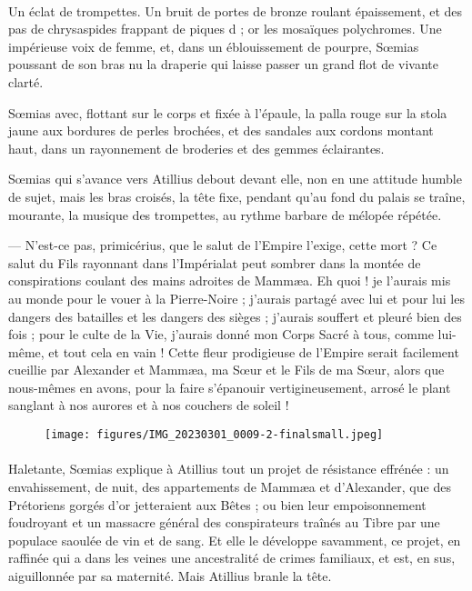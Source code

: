 \documentclass[a4paper, 11pt, oneside, polutonikogreek, french]{article}
\begin{document}
\paragraph{}
Un éclat de trompettes. Un bruit de portes de bronze roulant épaissement, et des pas de chrysaspides frappant de piques d ; or les mosaïques polychromes. Une impérieuse voix de femme, et, dans un éblouissement de pourpre, Sœmias poussant de son bras nu la draperie qui laisse passer un grand flot de vivante clarté.

Sœmias avec, flottant sur le corps et fixée à l'épaule, la palla rouge sur la stola jaune aux bordures de perles brochées, et des sandales aux cordons montant haut, dans un rayonnement de broderies et des gemmes éclairantes.

Sœmias qui s'avance vers Atillius debout devant elle, non en une attitude humble de sujet, mais les bras croisés, la tête fixe, pendant qu'au fond du palais se traîne, mourante, la musique des trompettes, au rythme barbare de mélopée répétée.

--- N'est-ce pas, primicérius, que le salut de l'Empire l'exige, cette mort ? Ce salut du Fils rayonnant dans l'Impérialat peut sombrer dans la montée de conspirations coulant des mains adroites de Mammæa. Eh quoi ! je l'aurais mis au monde pour le vouer à la Pierre-Noire ; j'aurais partagé avec lui et pour lui les dangers des batailles et les dangers des sièges ; j'aurais souffert et pleuré bien des fois ; pour le culte de la Vie, j'aurais donné mon Corps Sacré à tous, comme lui-même, et tout cela en vain ! Cette fleur prodigieuse de l'Empire serait facilement cueillie par Alexander et Mammæa, ma Sœur et le Fils de ma Sœur, alors que nous-mêmes en avons, pour la faire s'épanouir vertigineusement, arrosé le plant sanglant à nos aurores et à nos couchers de soleil !
\clearpage
\begin{landscape}
\pagestyle{fancy}
\fancyhf{}
\cfoot{\thepage}
\begin{figure}[H]
\centering
\texttt{[image: figures/IMG\_20230301\_0009-2-finalsmall.jpeg]}
\end{figure}
\end{landscape}
\clearpage
\paragraph{}
Haletante, Sœmias explique à Atillius tout un projet de résistance effrénée : un envahissement, de nuit, des appartements de Mammæa et d'Alexander, que des Prétoriens gorgés d'or jetteraient aux Bêtes ; ou bien leur empoisonnement foudroyant et un massacre général des conspirateurs traînés au Tibre par une populace saoulée de vin et de sang. Et elle le développe savamment, ce projet, en raffinée qui a dans les veines une ancestralité de crimes familiaux, et est, en sus, aiguillonnée par sa maternité. Mais Atillius branle la tête.
\end{document}
